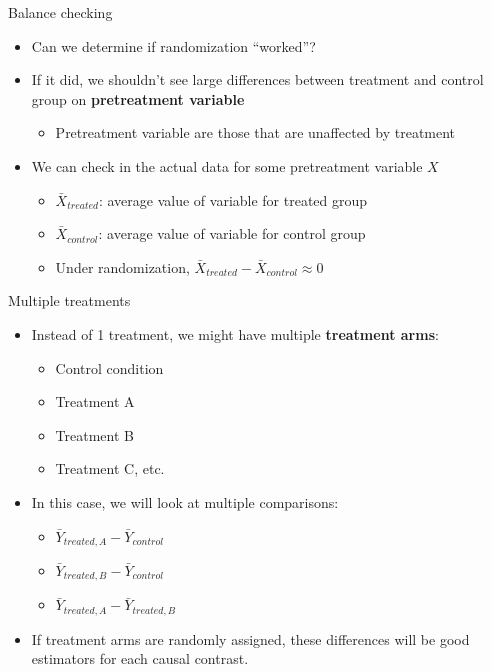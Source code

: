 \documentclass[
  ignorenonframetext,
]{beamer}
\providecommand{\tightlist}{%
  \setlength{\itemsep}{0pt}\setlength{\parskip}{0pt}}
\begin{document}
\begin{frame}{Balance checking}
\label{balance-checking}
\begin{itemize}
\tightlist
\item
  Can we determine if randomization ``worked''? \pause
\item
  If it did, we shouldn't see large differences between treatment and
  control group on \textbf{pretreatment variable} \pause

  \begin{itemize}
  \tightlist
  \item
    Pretreatment variable are those that are unaffected by treatment
    \pause
  \end{itemize}
\item
  We can check in the actual data for some pretreatment variable \(X\)
  \pause

  \begin{itemize}
  \tightlist
  \item
    \(\bar{X}_{treated}\): average value of variable for treated group
    \pause
  \item
    \(\bar{X}_{control}\): average value of variable for control group
    \pause
  \item
    Under randomization,
    \(\bar{X}_{treated} - \bar{X}_{control} \approx 0\)
  \end{itemize}
\end{itemize}
\end{frame}

\begin{frame}{Multiple treatments}
\label{multiple-treatments}
\begin{itemize}
\tightlist
\item
  Instead of 1 treatment, we might have multiple \textbf{treatment
  arms}: \pause

  \begin{itemize}
  \tightlist
  \item
    Control condition
  \item
    Treatment A
  \item
    Treatment B
  \item
    Treatment C, etc.
  \end{itemize}
\item
  In this case, we will look at multiple comparisons: \pause

  \begin{itemize}
  \tightlist
  \item
    \(\bar{Y}_{treated,A} - \bar{Y}_{control}\) \pause
  \item
    \(\bar{Y}_{treated,B} - \bar{Y}_{control}\) \pause
  \item
    \(\bar{Y}_{treated,A} - \bar{Y}_{treated,B}\) \pause
  \end{itemize}
\item
  If treatment arms are randomly assigned, these differences will be
  good estimators for each causal contrast.
\end{itemize}
\end{frame}
\end{document}
